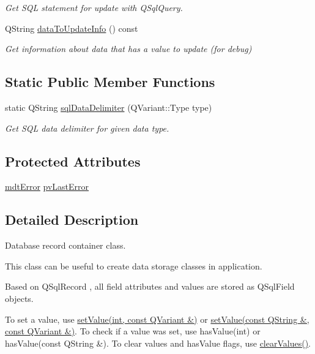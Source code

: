 \begin{DoxyCompactItemize}
\begin{DoxyCompactList}\small\item\em Get S\-Q\-L statement for update with Q\-Sql\-Query. \end{DoxyCompactList}\item 
Q\-String \hyperlink{classmdt_sql_record_a00c49b329d7170a8f840d7921f9b0f07}{data\-To\-Update\-Info} () const 
\begin{DoxyCompactList}\small\item\em Get information about data that has a value to update (for debug) \end{DoxyCompactList}\end{DoxyCompactItemize}
\subsection*{Static Public Member Functions}
\begin{DoxyCompactItemize}
\item 
static Q\-String \hyperlink{classmdt_sql_record_a1bc8d0787c3aa941afcf444d661c07db}{sql\-Data\-Delimiter} (Q\-Variant\-::\-Type type)
\begin{DoxyCompactList}\small\item\em Get S\-Q\-L data delimiter for given data type. \end{DoxyCompactList}\end{DoxyCompactItemize}
\subsection*{Protected Attributes}
\begin{DoxyCompactItemize}
\item 
\hyperlink{classmdt_error}{mdt\-Error} \hyperlink{classmdt_sql_record_ae320a7933f4d5a002efc509c4c9c5a12}{pv\-Last\-Error}
\end{DoxyCompactItemize}


\subsection{Detailed Description}
Database record container class. 

This class can be useful to create data storage classes in application.

Based on Q\-Sql\-Record , all field attributes and values are stored as Q\-Sql\-Field objects.

To set a value, use \hyperlink{classmdt_sql_record_a330291ff82fb8c7803c47d30f8939ed5}{set\-Value(int, const Q\-Variant \&)} or \hyperlink{classmdt_sql_record_a8bcaf65b449b6c82548735cdccb8cff1}{set\-Value(const Q\-String \&, const Q\-Variant \&)}. To check if a value was set, use has\-Value(int) or has\-Value(const Q\-String \&). To clear values and has\-Value flags, use \hyperlink{classmdt_sql_record_a0bfc0fc265c6b0048698e2f5d4f840a8}{clear\-Values()}.

